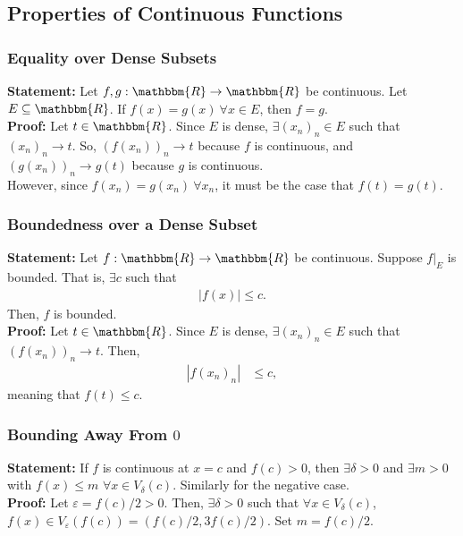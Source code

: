 \documentclass[10pt]{extarticle}
\newcommand{\R}{\mathbbm{R}}
\begin{document}
  \subsection{Properties of Continuous Functions}%
  \subsubsection{Equality over Dense Subsets}%
    \textbf{Statement:} Let $f,g: \R\rightarrow\R$ be continuous. Let $E\subseteq \R$. If $f(x) = g(x)~\forall x\in E$, then $f = g$.\\

    \textbf{Proof:} Let $t\in\R$. Since $E$ is dense, $\exists (x_n)_n \in E$ such that $(x_n)_n \rightarrow t$. So, $(f(x_n))_n \rightarrow t$ because $f$ is continuous, and $(g(x_n))_n \rightarrow g(t)$ because $g$ is continuous.\\

    However, since $f(x_n) = g(x_n)~\forall x_n$, it must be the case that $f(t) = g(t)$.
    \subsubsection{Boundedness over a Dense Subset}%
    \textbf{Statement:} Let $f: \R \rightarrow \R$ be continuous. Suppose $f\vert_{E}$ is bounded. That is, $\exists c$ such that
    \begin{align*}
      |f(x)| \leq c.\tag*{$\forall x\in E$}
    \end{align*}
    Then, $f$ is bounded.\\

    \textbf{Proof:} Let $t\in \R$. Since $E$ is dense, $\exists (x_n)_n \in E$ such that $(f(x_n))_n \rightarrow t$. Then,
    \begin{align*}
      |f(x_n)_n| &\leq c,
    \end{align*}
    meaning that $f(t) \leq c$.
    \subsubsection{Bounding Away From $0$}%
    \textbf{Statement:} If $f$ is continuous at $x=c$ and $f(c) > 0$, then $\exists \delta > 0$ and $\exists m > 0$ with $f(x) \leq m$ $\forall x \in V_{\delta}(c)$. Similarly for the negative case.\\

    \textbf{Proof:} Let $\varepsilon = f(c) / 2 > 0$. Then, $\exists \delta > 0$ such that $\forall x\in V_{\delta}(c)$, $f(x)\in V_{\varepsilon}(f(c)) = (f(c)/2,3f(c)/2)$. Set $m = f(c)/2$. 
\end{document}
